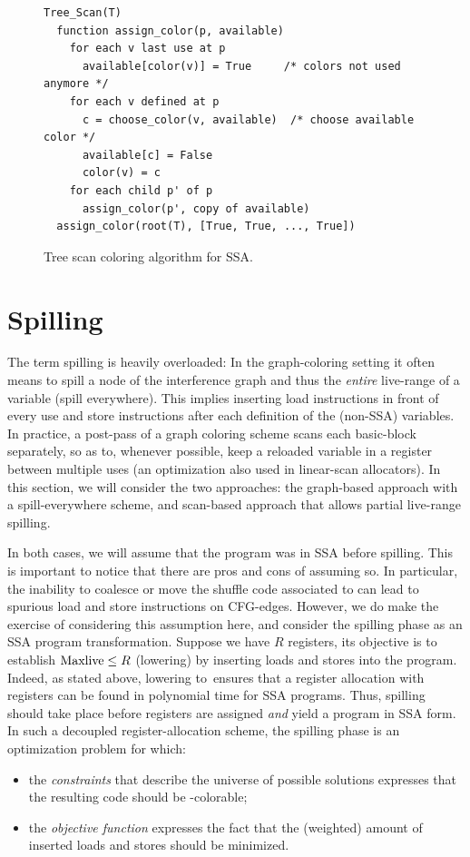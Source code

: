 {\begin{figure}
  \begin{verbatim}
Tree_Scan(T)
  function assign_color(p, available)
    for each v last use at p
      available[color(v)] = True     /* colors not used anymore */
    for each v defined at p
      c = choose_color(v, available)  /* choose available color */
      available[c] = False
      color(v) = c
    for each child p' of p
      assign_color(p', copy of available)
  assign_color(root(T), [True, True, ..., True])

  \end{verbatim}
  \caption{Tree scan coloring algorithm for SSA.}
  \label{code:assign-tree-scan}
\end{figure}




\section{Spilling}

The term spilling is heavily overloaded:
In the graph-coloring setting it often means to spill a node of the interference graph and thus the \emph{entire} live-range of a variable (spill everywhere).
This implies inserting load instructions in front of every use and store instructions after each definition of the (non-SSA) variables.
In practice, a post-pass of a graph coloring scheme scans each basic-block separately, so as to, whenever possible, keep a reloaded variable in a register between multiple uses (an optimization also used in linear-scan allocators).
In this section, we will consider the two approaches: the graph-based approach with a spill-everywhere scheme, and scan-based approach that allows partial live-range spilling.

In both cases, we will assume that the program was in SSA before spilling. 
This is important to notice that there are pros and cons of assuming so. 
In particular, the inability to coalesce or move the shuffle code associated to \phifuns can lead to spurious load and store instructions on CFG-edges. 
However, we do make the exercise of considering this assumption here, and consider the spilling phase as an SSA program transformation.
Suppose we have $R$ registers, its objective is to establish $\mathrm{Maxlive}\le R$ (\maxlive lowering) by inserting loads and stores into the program. 
Indeed, as stated above, lowering \maxlive to~\regs ensures that a register allocation with \regs registers can be found in polynomial time for SSA programs. 
Thus, spilling should take place before registers are assigned \emph{and} yield a program in SSA form. 
In such a decoupled register-allocation scheme, the spilling phase is an optimization problem for which: 
\begin{itemize}
  \item the \emph{constraints} that describe the universe of possible solutions expresses that the resulting code should be \regs-colorable; 
  \item the \emph{objective function} expresses the fact that the (weighted) amount of inserted loads and stores should be minimized.
\end{itemize}

}
